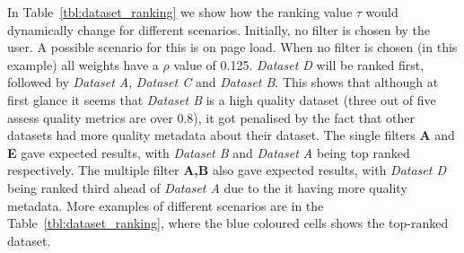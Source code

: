 In Table~\ref{tbl:dataset_ranking} we show how the ranking value $\tau$ would dynamically change for different scenarios.
Initially, no filter is chosen by the user.
A possible scenario for this is on page load.
When no filter is chosen (in this example) all weights have a $\rho$ value of 0.125.
\textit{Dataset D} will be ranked first, followed by \textit{Dataset A}, \textit{Dataset C} and \textit{Dataset B}.
This shows that although at first glance it seems that \textit{Dataset B} is a high quality dataset (three out of five assess quality metrics are over 0.8), it got penalised by the fact that other datasets had more quality metadata about their dataset.
The single filters \textbf{A} and \textbf{E} gave expected results, with \textit{Dataset B} and \textit{Dataset A} being top ranked respectively. 
The multiple filter \textbf{A,B} also gave expected results, with \textit{Dataset D} being ranked third ahead of \textit{Dataset A} due to the it having more quality metadata.
More examples of different scenarios are in the Table~\ref{tbl:dataset_ranking}, where the blue coloured cells shows the top-ranked dataset.
